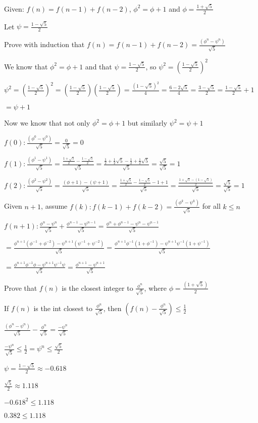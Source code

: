 \documentclass{article}
\begin{document}
Given: $ f(n) = f(n - 1) + f(n - 2) $,  $ \phi^2 = \phi + 1 $ and $ \phi = \frac{1 + \sqrt{5}}{2} $

Let $ \psi = \frac{1-\sqrt{5}}{2} $

Prove with induction that $ f(n) = f(n - 1) + f(n - 2) = \frac{(\phi^n-\psi^n)}{\sqrt{5}} $

We know that $ \phi^2 = \phi + 1$ and that $\psi = \frac{1-\sqrt{5}}{2}$, so $\psi^2 = (\frac{1-\sqrt{5}}{2})^2 $

$ \psi^2 = (\frac{1-\sqrt{5}}{2})^2 = (\frac{1-\sqrt{5}}{2})(\frac{1-\sqrt{5}}{2}) = \frac{(1-\sqrt{5})^2}{4} = \frac{6-2\sqrt5}{4} = \frac{3-\sqrt{5}}{2} = \frac{1-\sqrt{5}}{2} + 1 $

$ = \psi + 1 $

Now we know that not only $ \phi^2 = \phi + 1$ but similarly $\psi^2 = \psi + 1 $

$ f(0): \frac{(\phi^0-\psi^0)}{\sqrt{5}} = \frac{0}{\sqrt{5}} = 0 $

$ f(1): \frac{(\phi^1-\psi^1)}{\sqrt{5}} = \frac{\frac{1 + \sqrt{5}}{2} - \frac{1 - \sqrt{5}}{2}}{\sqrt{5}} = \frac{\frac{1}{2} + \frac{1}{2}\sqrt{5} - \frac{1}{2} + \frac{1}{2}\sqrt{5}}{\sqrt{5}} = \frac{\sqrt{5}}{\sqrt{5}} = 1 $

$ f(2): \frac{(\phi^2-\psi^2)}{\sqrt{5}} = \frac{(\phi + 1) - (\psi + 1)}{\sqrt{5}} = \frac{\frac{1 + \sqrt{5}}{2} - \frac{1 - \sqrt{5}}{2} - 1 + 1}{\sqrt{5}} = \frac{\frac{1 + \sqrt{5} - (1 - \sqrt{5})}{2}}{\sqrt{5}} = \frac{\sqrt{5}}{\sqrt{5}} = 1 $

Given $ n + 1 $, assume $ f(k): f(k - 1) + f(k - 2) = \frac{(\phi^k-\psi^k)}{\sqrt{5}} $ for all $ k \leq n $

$ f(n+1): \frac{\phi^n - \psi^n}{\sqrt{5}} + \frac{\phi^{n - 1} - \psi^{n - 1}}{\sqrt{5}} = \frac{\phi^n + \phi^{n - 1} - \psi^n - \psi^{n - 1}}{\sqrt{5}} $

$ = \frac{\phi^{n + 1}(\phi^{-1} + \phi^{-2}) - \psi^{n + 1}(\psi^{-1} + \psi^{-2})}{\sqrt{5}} = \frac{\phi^{n + 1}\phi^{-1}(1 + \phi^{-1}) - \psi^{n + 1}\psi^{-1}(1 + \psi^{-1})}{\sqrt{5}} $

$ = \frac{\phi^{n + 1}\phi^{-1}\phi - \psi^{n + 1}\psi^{-1}\psi}{\sqrt{5}} = \frac{\phi^{n + 1} - \psi^{n + 1}}{\sqrt{5}} $

Prove that $ f(n) $ is the closest integer to $ \frac{\phi^n}{\sqrt{5}} $, where $ \phi = \frac{(1 + \sqrt{5})}{2} $

If $ f(n) $ is the int closest to $ \frac{\phi^n}{\sqrt{5}} $, then $ (f(n) - \frac{\phi^n}{\sqrt{5}}) \leq \frac{1}{2} $

$ \frac{(\phi^n-\psi^n)}{\sqrt{5}} - \frac{\phi^n}{\sqrt{5}} = \frac{-\psi^n}{\sqrt{5}} $

$ \frac{-\psi^n}{\sqrt{5}} \leq \frac{1}{2} = \psi^n \leq \frac{\sqrt{5}}{2} $

$ \psi = \frac{1-\sqrt{5}}{2} \approx -0.618 $

$ \frac{\sqrt{5}}{2} \approx 1.118 $

$ -0.618^2 \leq 1.118 $

$ 0.382 \leq 1.118 $
\end{document}
